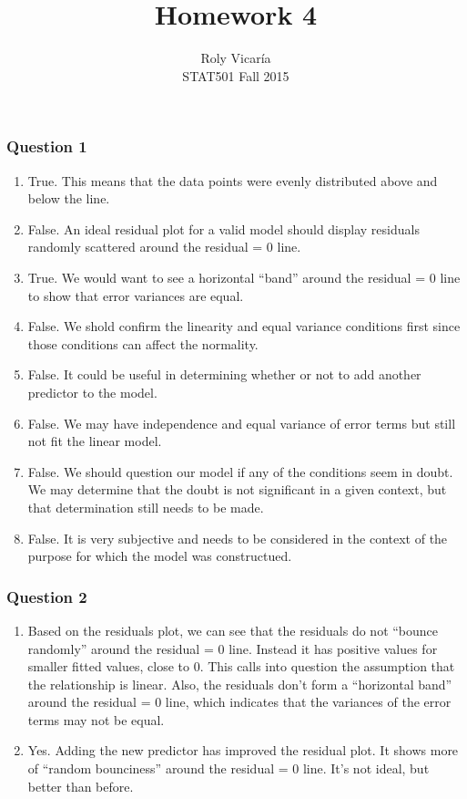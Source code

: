 \documentclass{article}
\title{Homework 4}
\author{Roly Vicar\'ia \\ STAT501 Fall 2015}
\begin{document}
    
    
    \maketitle
    
    

    
    \subsubsection{Question 1}\label{question-1}

\begin{enumerate}
\def\labelenumi{\alph{enumi})}
\item
  True. This means that the data points were evenly distributed above
  and below the line.
\item
  False. An ideal residual plot for a valid model should display
  residuals randomly scattered around the residual = 0 line.
\item
  True. We would want to see a horizontal ``band'' around the residual =
  0 line to show that error variances are equal.
\item
  False. We shold confirm the linearity and equal variance conditions
  first since those conditions can affect the normality.
\item
  False. It could be useful in determining whether or not to add another
  predictor to the model.
\item
  False. We may have independence and equal variance of error terms but
  still not fit the linear model.
\item
  False. We should question our model if any of the conditions seem in
  doubt. We may determine that the doubt is not significant in a given
  context, but that determination still needs to be made.
\item
  False. It is very subjective and needs to be considered in the context
  of the purpose for which the model was constructued.
\end{enumerate}

    \subsubsection{Question 2}\label{question-2}

\begin{enumerate}
\def\labelenumi{\alph{enumi})}
\item
  Based on the residuals plot, we can see that the residuals do not
  ``bounce randomly'' around the residual = 0 line. Instead it has
  positive values for smaller fitted values, close to 0. This calls into
  question the assumption that the relationship is linear. Also, the
  residuals don't form a ``horizontal band'' around the residual = 0
  line, which indicates that the variances of the error terms may not be
  equal.
\item
  Yes. Adding the new predictor has improved the residual plot. It shows
  more of ``random bounciness'' around the residual = 0 line. It's not
  ideal, but better than before.
\end{enumerate}
\end{document}
